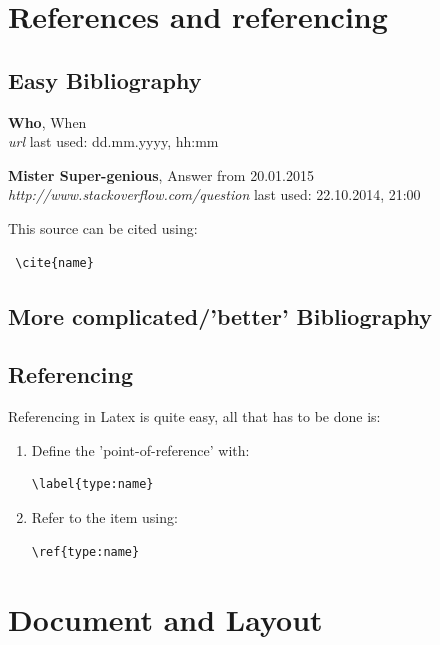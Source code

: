 \documentclass[12pt]{article}
\begin{document}
\section{References and referencing}
\subsection{Easy Bibliography}
\begin{thebibliography}{56}

   \textbf{Who}, When\\
  \textit{url}
  \newline last used: dd.mm.yyyy, hh:mm
 
  \textbf{Mister Super-genious}, Answer from 20.01.2015\\
  \textit{http://www.stackoverflow.com/question}
  \newline last used: 22.10.2014, 21:00
\end{thebibliography}

This source can be cited using:
\begin{lstlisting}
 \cite{name}
\end{lstlisting}
 \cite{name}

\subsection{More complicated/'better' Bibliography}

\subsection{Referencing}
Referencing in Latex is quite easy, all that has to be done is:
\begin{enumerate}
\item Define the 'point-of-reference' with: 
\begin{lstlisting}
\label{type:name}
\end{lstlisting}
\item Refer to the item using: 
\begin{lstlisting}
\ref{type:name}
\end{lstlisting}
\end{enumerate}
\newpage
\section{Document and Layout}
\end{document}
